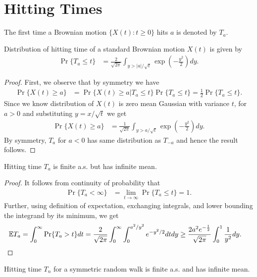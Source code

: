 \documentclass[a4paper,10pt,english]{article}
\begin{document}
\section{Hitting Times}
\begin{defn} The first time a Brownian motion $\{X(t): t \geqslant 0\}$ hits $a$ is denoted by $T_a$.
\end{defn}
\begin{thm} Distribution of hitting time of a standard Brownian motion $X(t)$ is given by
\begin{align*}
\Pr\{T_a \leq t\} &= \frac{2}{\sqrt{2 \pi}}\int_{y > |a|/\sqrt{t}}\exp\left(-\frac{y^2}{2}\right)dy.
\end{align*}
\end{thm}
\begin{proof} First, we observe that by symmetry we have
\begin{align*}
\Pr\{X(t) \geq a\} &= \Pr\{X(t) \geq a | T_a \leq t\}\Pr\{T_a \leq t\} = \frac{1}{2}\Pr\{T_a \leq t\}.%
\end{align*}
Since we know distribution of $X(t)$ is zero mean Gaussian with variance $t$, for $a > 0$ and substituting $y = x/\sqrt{t}$ we get
\begin{align*}
\Pr\{X(t) \geq a\} &= \frac{1}{\sqrt{2\pi}}\int_{y > a/\sqrt{t}}\exp(-\frac{y^2}{2})dy.
\end{align*}
By symmetry, $T_a$ for $a < 0$ has same distribution as $T_{-a}$ and hence the result follows.
\end{proof}
\begin{cor} Hitting time $T_a$ is finite a.s. but has infinite mean.
\end{cor}
\begin{proof} It follows from continuity of probability that 
\begin{align*}
\Pr\{T_a < \infty \} &= \lim_{t \to \infty}\Pr\{T_a \leq t\} = 1.
\end{align*}
Further, using definition of expectation, exchanging integrals, and lower bounding the integrand by its minimum, we get
\begin{align*}
\E T_a &= \int_{0}^{\infty}\Pr\{T_a > t \} dt %
= \frac{2}{\sqrt{2\pi}}\int_{0}^{\infty}\int_{0}^{a^2/y^2} e^{-y^2/2} dt dy \geq \frac{2a^2e^{-\frac{1}{2}}}{\sqrt{2\pi}}\int_{0}^{1}\frac{1}{y^2}dy.
\end{align*}
\end{proof}
\begin{rem} Hitting time $T_n$ for a symmetric random walk is finite a.s. and has infinite mean.
\end{rem}
\end{document}
